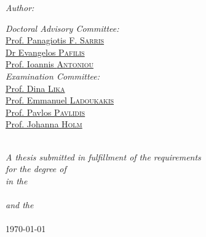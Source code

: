 \documentclass[
11pt, %
english, %
singlespacing, %
toctotoc, %
headsepline, %
]{MastersDoctoralThesis} %
\begin{document}
\begin{titlepage}
\begin{center}
\begin{minipage}[t]{0.4\textwidth}
\begin{flushleft} \large
\emph{Author:}\\
\href{http://www.johnsmith.com}{\authorname} %
\end{flushleft}
\end{minipage}
\begin{minipage}[t]{0.5\textwidth}
\begin{flushright} \large
\emph{Doctoral Advisory Committee:} \\
\href{https://www.imbb.forth.gr/imbb-people/en/sarris-members/item/2695-dr-panagiotis-f-sarris}{Prof. Panagiotis F. \textsc{Sarris}}\\ %
\href{http://lab42open.hcmr.gr/people/evangelospafilis/}{Dr Evangelos \textsc{Pafilis}}\\ %
\href{https://users.auth.gr/~iantonio/MEMBERSAntoniou.html}{Prof. Ioannis \textsc{Antoniou}}\\ %
\emph{Examination Committee:} \\
\href{https://dinalika.weebly.com}{Prof. Dina \textsc{Lika}}\\ %
\href{https://www.biology.uoc.gr/index.php/en/personnel/faculty-members?view=article&id=246:ladoukakis-emmanuel&catid=27:dep-en-gb}{Prof. Emmanuel \textsc{Ladoukakis}}\\ %
\href{http://pop-gen.eu/wordpress/people}{Prof. Pavlos \textsc{Pavlidis}}\\ %
\href{https://www.medschool.umaryland.edu/profiles/holm-johanna/}{Prof. Johanna \textsc{Holm}}\\ %
\end{flushright}
\end{minipage}\\[1cm]
 

\large \textit{A thesis submitted in fulfillment of the requirements\\ for the degree of \degreename}\\[0.3cm] %
\textit{in the}\\[0.4cm]
\deptname\\[0.4cm] 

\textit{and the}\\[0.4cm]
\groupname\\[0.5cm] %
 
\vspace{1cm}
{\large \today}\\[4cm] %
 
\end{center}
\end{titlepage}
\end{document}
